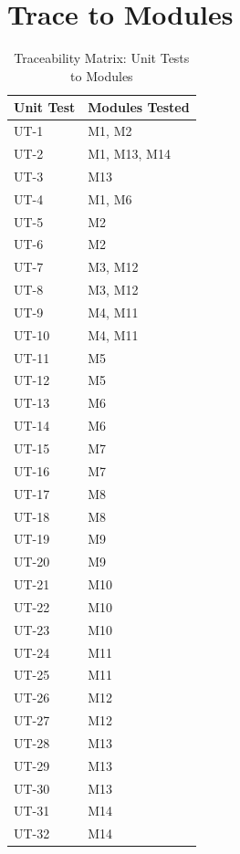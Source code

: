 \documentclass[12pt, titlepage]{article}
\begin{document}
\section{Trace to Modules}
\begin{table}[H]
\centering
\begin{tabular}{|l|l|}
\hline
\textbf{Unit Test} & \textbf{Modules Tested} \\ \hline
UT-1 & M1, M2 \\ \hline
UT-2 & M1, M13, M14 \\ \hline
UT-3 & M13 \\ \hline
UT-4 & M1, M6 \\ \hline
UT-5 & M2 \\ \hline
UT-6 & M2 \\ \hline
UT-7 & M3, M12 \\ \hline
UT-8 & M3, M12 \\ \hline
UT-9 & M4, M11 \\ \hline
UT-10 & M4, M11 \\ \hline
UT-11 & M5 \\ \hline
UT-12 & M5 \\ \hline
UT-13 & M6 \\ \hline
UT-14 & M6 \\ \hline
UT-15 & M7 \\ \hline
UT-16 & M7 \\ \hline
UT-17 & M8 \\ \hline
UT-18 & M8 \\ \hline
UT-19 & M9 \\ \hline
UT-20 & M9 \\ \hline
UT-21 & M10 \\ \hline
UT-22 & M10 \\ \hline
UT-23 & M10 \\ \hline
UT-24 & M11 \\ \hline
UT-25 & M11 \\ \hline
UT-26 & M12 \\ \hline
UT-27 & M12 \\ \hline
UT-28 & M13 \\ \hline
UT-29 & M13 \\ \hline
UT-30 & M13 \\ \hline
UT-31 & M14 \\ \hline
UT-32 & M14 \\ \hline
\end{tabular}
\caption{Traceability Matrix: Unit Tests to Modules \citep{}}
\label{tab:traceability}
\end{table}
  
\end{document}

